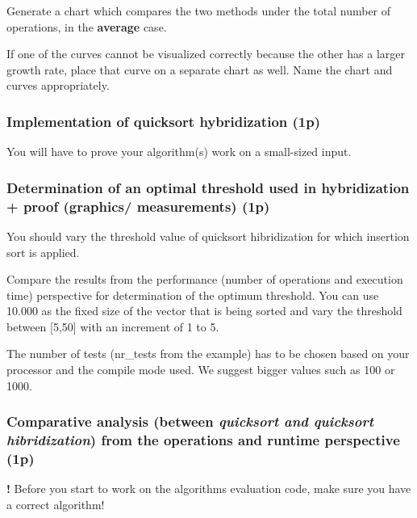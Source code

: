 \documentclass[../en-fa-lab.tex]{subfiles}
\begin{document}
Generate a chart which compares the two methods under the total number
of operations, in the \textbf{average} case.

If one of the curves cannot be visualized correctly because the other
has a larger growth rate, place that curve on a separate chart as well.
Name the chart and curves appropriately.

\subsubsection{Implementation of quicksort hybridization
(1p)}\label{implementation-of-quicksort-hybridization-1p}

You will have to prove your algorithm(s) work on a small-sized input.

\subsubsection{Determination of an optimal threshold used in hybridization
+ proof (graphics/ measurements)
(1p)}\label{determination-of-an-optimal-threshold-used-in-hybridization-proof-graphics-measurements-1p}

You should vary the threshold value of quicksort hibridization for which
insertion sort is applied.

Compare the results from the performance (number of operations and
execution time) perspective for determination of the optimum threshold.
You can use 10.000 as the fixed size of the vector that is being sorted
and vary the threshold between {[}5,50{]} with an increment of 1 to 5.

The number of tests (nr\_tests from the example) has to be chosen based
on your processor and the compile mode used. We suggest bigger values
such as 100 or 1000.

\subsubsection{\texorpdfstring{Comparative analysis (between
\emph{quicksort and quicksort hibridization}) from the operations and
runtime perspective
(1p)}{Comparative analysis (between quicksort and quicksort hibridization) from the operations and runtime perspective (1p)}}\label{comparative-analysis-between-quicksort-and-quicksort-hibridization-from-the-operations-and-runtime-perspective-1p}

\textbf{!} Before you start to work on the algorithms evaluation code,
make sure you have a correct algorithm!
\end{document}
